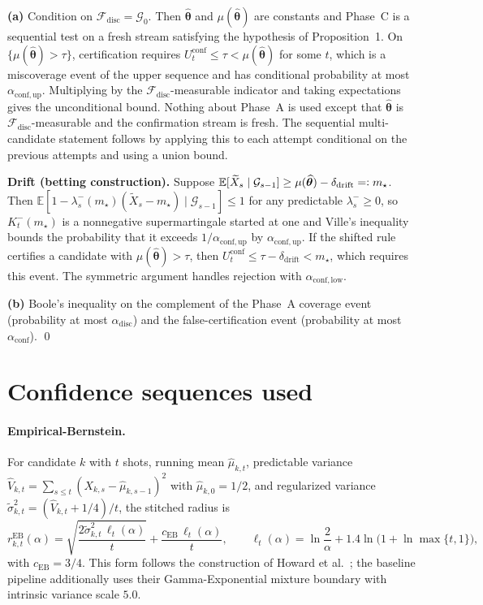 \documentclass[a4paper,onecolumn,unpublished]{quantumarticle}
\newcommand{\E}{\mathbb{E}}
\newcommand{\G}{\mathcal{G}}
\newcommand{\Fdisc}{\mathcal{F}_{\mathrm{disc}}}
\newcommand{\adisc}{\alpha_{\mathrm{disc}}}
\newcommand{\aconf}{\alpha_{\mathrm{conf}}}
\newcommand{\aup}{\alpha_{\mathrm{conf,up}}}
\newcommand{\alow}{\alpha_{\mathrm{conf,low}}}
\newcommand{\ddrift}{\delta_{\mathrm{drift}}}
\newcommand{\thhat}{\widehat{\bm{\theta}}}
\begin{document}
\noindent\textbf{(a)} Condition on $\Fdisc = \G_0$. Then $\thhat$ and $\mu(\thhat)$ are constants and Phase~C is a sequential test on a fresh stream satisfying the hypothesis of Proposition~1. On $\{\mu(\thhat) > \tau\}$, certification requires $U_t^{\mathrm{conf}} \le \tau < \mu(\thhat)$ for some $t$, which is a miscoverage event of the upper sequence and has conditional probability at most $\aup$. Multiplying by the $\Fdisc$-measurable indicator and taking expectations gives the unconditional bound. Nothing about Phase~A is used except that $\thhat$ is $\Fdisc$-measurable and the confirmation stream is fresh. The sequential multi-candidate statement follows by applying this to each attempt conditional on the previous attempts and using a union bound.

\noindent\textbf{Drift (betting construction).} Suppose $\E[\widetilde X_s \mid \G_{s-1}] \ge \mu(\thhat) - \ddrift =\vcentcolon m_\star$. Then $\E[1 - \lambda_s^-(m_\star)(\widetilde X_s - m_\star) \mid \G_{s-1}] \le 1$ for any predictable $\lambda_s^- \ge 0$, so $K_t^-(m_\star)$ is a nonnegative supermartingale started at one and Ville's inequality bounds the probability that it exceeds $1/\aup$ by $\aup$. If the shifted rule certifies a candidate with $\mu(\thhat) > \tau$, then $U_t^{\mathrm{conf}} \le \tau - \ddrift < m_\star$, which requires this event. The symmetric argument handles rejection with $\alow$.

\noindent\textbf{(b)} Boole's inequality on the complement of the Phase~A coverage event (probability at most $\adisc$) and the false-certification event (probability at most $\aconf$). \qed

\section{Confidence sequences used}
\label{app:cs_used}

\paragraph*{Empirical-Bernstein.}
For candidate $k$ with $t$ shots, running mean $\widehat\mu_{k,t}$, predictable variance $\widehat V_{k,t} = \sum_{s\le t}(X_{k,s} - \widehat\mu_{k,s-1})^2$ with $\widehat\mu_{k,0} = 1/2$, and regularized variance $\tilde\sigma_{k,t}^2 = (\widehat V_{k,t} + 1/4)/t$, the stitched radius is
\[
  r_{k,t}^{\mathrm{EB}}(\alpha) = \sqrt{\frac{2\tilde\sigma_{k,t}^2\,\ell_t(\alpha)}{t}} + \frac{c_{\mathrm{EB}}\,\ell_t(\alpha)}{t},
  \qquad
  \ell_t(\alpha) = \ln\frac{2}{\alpha} + 1.4\ln\bigl(1 + \ln\max\{t, 1\}\bigr),
\]
with $c_{\mathrm{EB}} = 3/4$. This form follows the construction of Howard et al.\ \cite{howard2021}; the baseline pipeline additionally uses their Gamma-Exponential mixture boundary with intrinsic variance scale $5.0$.
\end{document}
